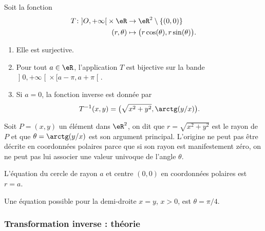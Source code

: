 \begin{proposition}     \label{PROPooFLUAooDsyMXO}
    Soit la fonction
    \begin{equation}
        \begin{aligned}
        T\colon \mathopen] O , +\infty \mathclose[\times \eR&\to \eR^2\setminus\{(0,0)\} \\
            (r,\theta)&\mapsto \big( r\cos(\theta),r\sin(\theta) \big).
        \end{aligned}
    \end{equation}
    \begin{enumerate}
        \item
            Elle est surjective.
        \item
        Pour tout \( a\in \eR\), l'application \( T\) est bijective sur la bande \( \mathopen] 0 , +\infty \mathclose[\times \mathopen[ a-\pi , a+\pi \mathclose[\).
        \item
            Si \( a=0\), la fonction inverse est donnée par
            \begin{equation}
                T^{-1}(x,y)=\big( \sqrt{ x^2+y^2 },\arctg(y/x) \big).
            \end{equation}
    \end{enumerate}
\end{proposition}

    Soit $P=(x,y)$ un élément dans $\eR^2$, on dit que $r=\sqrt{x^2+y^2}$ est le rayon de $P$ et que $\theta=\arctg (y/x) $ est son argument principal. L'origine ne peut pas être décrite en coordonnées polaires parce que si son rayon est manifestement zéro, on ne peut pas lui associer une valeur univoque de l'angle $\theta$.

\begin{example}
L'équation du cercle de rayon $a$ et centre $(0, 0)$ en coordonnées polaires est $r=a$.
\end{example}

\begin{example}
	Une équation possible pour la demi-droite $x=y$, $x>0$,  est $\theta=\pi/4$.
\end{example}
\subsubsection{Transformation inverse : théorie}

